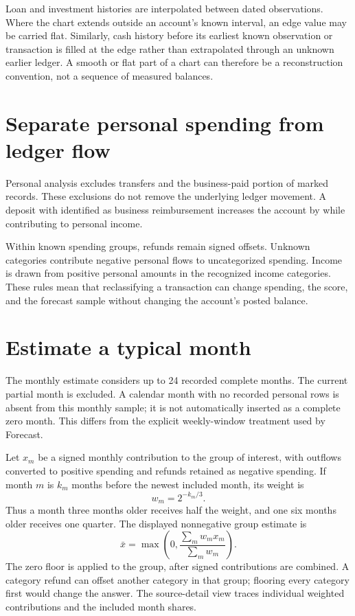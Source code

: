 Loan and investment histories are interpolated between dated observations. Where the chart extends outside an account's known interval, an edge value may be carried flat. Similarly, cash history before its earliest known observation or transaction is filled at the edge rather than extrapolated through an unknown earlier ledger. A smooth or flat part of a chart can therefore be a reconstruction convention, not a sequence of measured balances.

\section{Separate personal spending from ledger flow}
Personal analysis excludes transfers and the business-paid portion of marked records. These exclusions do not remove the underlying ledger movement. A  deposit with  identified as business reimbursement increases the account by  while contributing  to personal income.

Within known spending groups, refunds remain signed offsets. Unknown categories contribute negative personal flows to uncategorized spending. Income is drawn from positive personal amounts in the recognized income categories. These rules mean that reclassifying a transaction can change spending, the score, and the forecast sample without changing the account's posted balance.

\section{Estimate a typical month}
The monthly estimate considers up to 24 recorded complete months. The current partial month is excluded. A calendar month with no recorded personal rows is absent from this monthly sample; it is not automatically inserted as a complete zero month. This differs from the explicit weekly-window treatment used by Forecast.

Let \(x_m\) be a signed monthly contribution to the group of interest, with outflows converted to positive spending and refunds retained as negative spending. If month \(m\) is \(k_m\) months before the newest included month, its weight is
\[
 w_m=2^{-k_m/3}.
\]
Thus a month three months older receives half the weight, and one six months older receives one quarter. The displayed nonnegative group estimate is
\begin{equation}
 \bar{x}=\max\left(0,\frac{\sum_m w_m x_m}{\sum_m w_m}\right).
\end{equation}
The zero floor is applied to the group, after signed contributions are combined. A category refund can offset another category in that group; flooring every category first would change the answer. The source-detail view traces individual weighted contributions and the included month shares.

